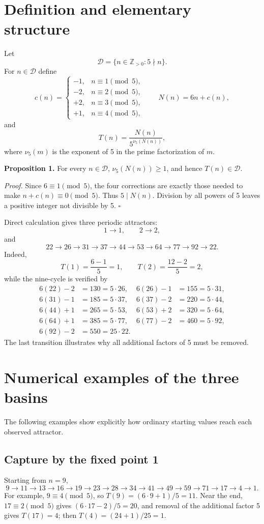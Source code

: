 \documentclass[11pt]{article}
\begin{document}
\section{Definition and elementary structure}
Let
\[
\mathcal{D}=\{n\in\mathbb{Z}_{>0}:5\nmid n\}.
\]
For $n\in\mathcal{D}$ define
\[
c(n)=\begin{cases}
-1,&n\equiv1\pmod5,\\
-2,&n\equiv2\pmod5,\\
+2,&n\equiv3\pmod5,\\
+1,&n\equiv4\pmod5,
\end{cases}
\qquad N(n)=6n+c(n),
\]
and
\begin{equation}
T(n)=\frac{N(n)}{5^{\nu_5(N(n))}},
\label{eq:T}
\end{equation}
where $\nu_5(m)$ is the exponent of 5 in the prime factorization of $m$.

\textbf{Proposition 1.} For every $n\in\mathcal{D}$, $\nu_5(N(n))\ge1$, and hence $T(n)\in\mathcal{D}$.

\textit{Proof.} Since $6\equiv1\pmod5$, the four corrections are exactly those needed to make $n+c(n)\equiv0\pmod5$. Thus $5\mid N(n)$. Division by all powers of 5 leaves a positive integer not divisible by 5. \hfill$\square$

Direct calculation gives three periodic attractors:
\[
1\longrightarrow1,\qquad 2\longrightarrow2,
\]
and
\[
22\to26\to31\to37\to44\to53\to64\to77\to92\to22.
\]
Indeed,
\[
T(1)=\frac{6-1}{5}=1,\qquad T(2)=\frac{12-2}{5}=2,
\]
while the nine-cycle is verified by
\begin{align*}
6(22)-2&=130=5\cdot26, & 6(26)-1&=155=5\cdot31,\\
6(31)-1&=185=5\cdot37, & 6(37)-2&=220=5\cdot44,\\
6(44)+1&=265=5\cdot53, & 6(53)+2&=320=5\cdot64,\\
6(64)+1&=385=5\cdot77, & 6(77)-2&=460=5\cdot92,\\
6(92)-2&=550=25\cdot22.&&
\end{align*}
The last transition illustrates why all additional factors of 5 must be removed.

\section{Numerical examples of the three basins}
The following examples show explicitly how ordinary starting values reach each observed attractor.

\subsection*{Capture by the fixed point 1}
Starting from $n=9$,
\[
9\to11\to13\to16\to19\to23\to28\to34\to41\to49\to59\to71\to17\to4\to1.
\]
For example, $9\equiv4\pmod5$, so $T(9)=(6\cdot9+1)/5=11$. Near the end, $17\equiv2\pmod5$ gives $(6\cdot17-2)/5=20$, and removal of the additional factor 5 gives $T(17)=4$; then $T(4)=(24+1)/25=1$.
\end{document}
